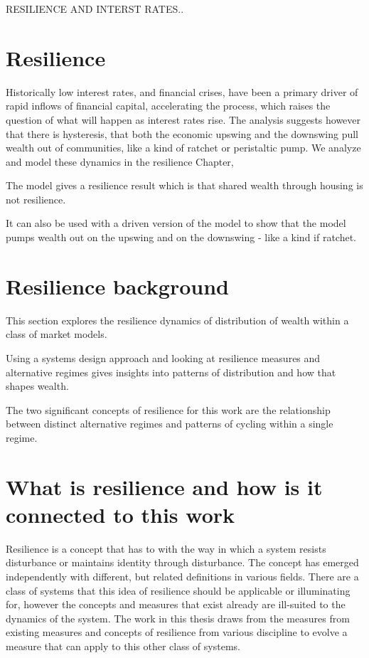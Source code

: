 RESILIENCE AND INTERST RATES..




\section{Resilience}
Historically low interest rates, and financial crises, have been a primary driver of rapid inflows of financial capital, accelerating the process, which raises the question of what will happen as interest rates rise. The analysis suggests however that there is hysteresis, that both the economic upswing and the downswing pull wealth out of communities, like a kind of ratchet or peristaltic pump. We analyze and model these dynamics in the resilience Chapter, %

The model gives a resilience result which is that shared wealth through housing is not resilience.

It can also be used with a driven version of the model to show that the model pumps wealth out on the upswing and on the downswing - like a kind if ratchet.


\section{Resilience background}

This section explores the resilience dynamics of distribution of wealth within a class of market models.  

Using a systems design approach and looking at resilience measures and alternative regimes gives insights into patterns of distribution and how that shapes wealth. 

The two significant concepts of resilience for this work are the relationship between distinct alternative regimes and patterns of cycling within a single regime. 

\section{What is resilience and how is it connected to this work}

Resilience is a concept that has to with the way in which a system resists disturbance or maintains identity through disturbance. The concept has emerged independently with different, but related definitions in various fields. 
There are a class of systems that this idea of resilience should be applicable or illuminating for, however the concepts and measures that exist already are ill-suited to the dynamics of the system. 
The work in this thesis draws from the measures from existing measures and concepts of resilience from various discipline to evolve a measure that can apply to this other class of systems. 

